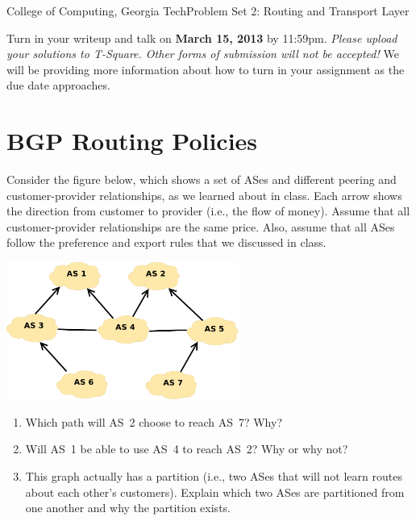 \documentclass[11pt]{article}
\begin{document}


{College of Computing, Georgia Tech}{Problem Set 2: Routing and
  Transport Layer} 


Turn in your writeup and talk on {\bf March 15, 2013} by 11:59pm.
{\em Please upload your solutions to T-Square.  Other forms of
  submission will not be accepted!}  We will be providing more
information about how to turn in your assignment as the due date
approaches.


\section{BGP Routing Policies}

Consider the figure below, which shows a set of ASes and different
peering and customer-provider relationships, as we learned about in
class. Each arrow shows the direction from customer to provider (i.e.,
the flow of money).  Assume that all customer-provider relationships are
the same price.  Also, assume that all ASes follow the preference and
export rules that we discussed in class.

\begin{center}
\includegraphics[width=3in]{as-rel}
\end{center}

\begin{enumerate}
\item Which path will AS~2 choose to reach AS~7?  Why?
\item Will AS~1 be able to use AS~4 to reach AS~2?  Why or why not?
\item This graph actually has a partition (i.e., two ASes that will not
  learn routes about each other's customers).  Explain which two ASes
  are partitioned from one another and why the partition exists.
\end{enumerate}
\end{document}
